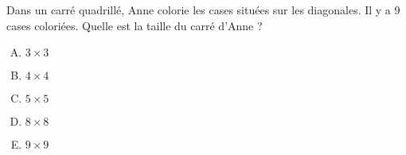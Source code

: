 Dans un carré quadrillé, Anne colorie les cases situées sur les diagonales. Il y a 9 cases
coloriées. Quelle est la taille du carré d'Anne ?
\begin{multicols}{5}
  \begin{enumerate}[A)]
  \item $3\times3$
  \item $4\times4$
  \item $5\times5$
  \item $8\times8$
  \item $9\times9$
  \end{enumerate}
\end{multicols}